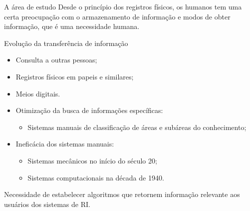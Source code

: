 \documentclass[%
  10pt,%
  aspectratio = 169,%
  compress,%
  t,%
]{beamer}%
\begin{document}
    
    \begin{frame}{}{A área de estudo}
        Desde o princípio dos registros físicos, os humanos tem uma certa preocupação com o armazenamento de informação e modos de obter informação, que é uma necessidade humana.
        
        \begin{block}{Evolução da transferência de informação}
            \begin{itemize}
                \item Consulta a outras pessoas;
                \item Registros físicos em papeis e similares;
                \item Meios digitais.
            \end{itemize}
        \end{block}
        
        \begin{itemize}
            \item Otimização da busca de informações específicas:
            \begin{itemize}
                \item Sistemas manuais de classificação de áreas e subáreas do conhecimento;
            \end{itemize}
            \item Ineficácia dos sistemas manuais:
            \begin{itemize}
                \item Sistemas mecânicos no início do século 20;
                \item Sistemas computacionais na década de 1940.
            \end{itemize}
        \end{itemize}
        
        
        Necessidade de estabelecer algoritmos que retornem informação relevante aos usuários dos sistemas de RI.
    \end{frame}
    
\end{document}
